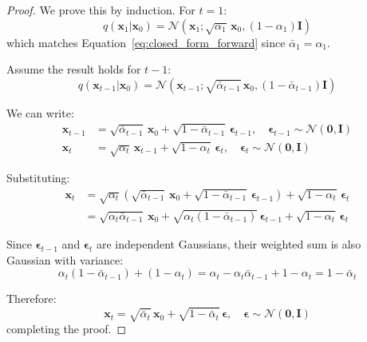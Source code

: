 \begin{proof}
We prove this by induction. For $t=1$:
\begin{equation}
q(\mathbf{x}_1 | \mathbf{x}_0) = \mathcal{N}\left(\mathbf{x}_1; \sqrt{\alpha_1}\,\mathbf{x}_0, (1-\alpha_1)\mathbf{I}\right)
\end{equation}
which matches Equation~\ref{eq:closed_form_forward} since $\bar{\alpha}_1 = \alpha_1$.

Assume the result holds for $t-1$:
\begin{equation}
q(\mathbf{x}_{t-1} | \mathbf{x}_0) = \mathcal{N}\left(\mathbf{x}_{t-1}; \sqrt{\bar{\alpha}_{t-1}}\,\mathbf{x}_0, (1-\bar{\alpha}_{t-1})\mathbf{I}\right)
\end{equation}

We can write:
\begin{align}
\mathbf{x}_{t-1} &= \sqrt{\bar{\alpha}_{t-1}}\,\mathbf{x}_0 + \sqrt{1-\bar{\alpha}_{t-1}}\,\boldsymbol{\epsilon}_{t-1}, \quad \boldsymbol{\epsilon}_{t-1} \sim \mathcal{N}(\mathbf{0}, \mathbf{I}) \\
\mathbf{x}_t &= \sqrt{\alpha_t}\,\mathbf{x}_{t-1} + \sqrt{1-\alpha_t}\,\boldsymbol{\epsilon}_t, \quad \boldsymbol{\epsilon}_t \sim \mathcal{N}(\mathbf{0}, \mathbf{I})
\end{align}

Substituting:
\begin{align}
\mathbf{x}_t &= \sqrt{\alpha_t}\left(\sqrt{\bar{\alpha}_{t-1}}\,\mathbf{x}_0 + \sqrt{1-\bar{\alpha}_{t-1}}\,\boldsymbol{\epsilon}_{t-1}\right) + \sqrt{1-\alpha_t}\,\boldsymbol{\epsilon}_t \\
&= \sqrt{\alpha_t \bar{\alpha}_{t-1}}\,\mathbf{x}_0 + \sqrt{\alpha_t(1-\bar{\alpha}_{t-1})}\,\boldsymbol{\epsilon}_{t-1} + \sqrt{1-\alpha_t}\,\boldsymbol{\epsilon}_t
\end{align}

Since $\boldsymbol{\epsilon}_{t-1}$ and $\boldsymbol{\epsilon}_t$ are independent Gaussians, their weighted sum is also Gaussian with variance:
\begin{equation}
\alpha_t(1-\bar{\alpha}_{t-1}) + (1-\alpha_t) = \alpha_t - \alpha_t\bar{\alpha}_{t-1} + 1 - \alpha_t = 1 - \bar{\alpha}_t
\end{equation}

Therefore:
\begin{equation}
\mathbf{x}_t = \sqrt{\bar{\alpha}_t}\,\mathbf{x}_0 + \sqrt{1-\bar{\alpha}_t}\,\boldsymbol{\epsilon}, \quad \boldsymbol{\epsilon} \sim \mathcal{N}(\mathbf{0}, \mathbf{I})
\end{equation}
completing the proof.
\end{proof}

